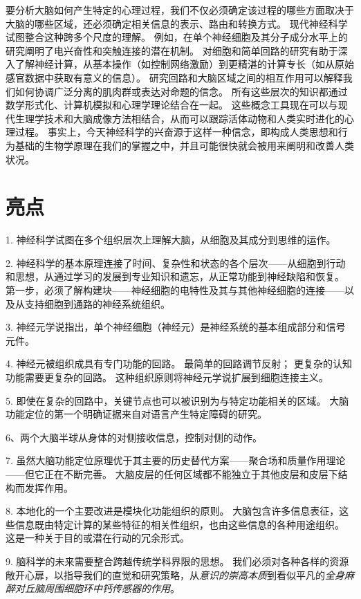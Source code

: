 要分析大脑如何产生特定的心理过程，我们不仅必须确定该过程的哪些方面取决于大脑的哪些区域，还必须确定相关信息的表示、路由和转换方式。
现代神经科学试图整合这种跨多个尺度的理解。
例如，在单个神经细胞及其分子成分水平上的研究阐明了电兴奋性和突触连接的潜在机制。
对细胞和简单回路的研究有助于深入了解神经计算，从基本操作（如控制网络激励）到更精湛的计算专长（如从原始感官数据中获取有意义的信息）。
研究回路和大脑区域之间的相互作用可以解释我们如何协调广泛分离的肌肉群或表达对命题的信念。
所有这些层次的知识都通过数学形式化、计算机模拟和心理学理论结合在一起。
这些概念工具现在可以与现代生理学技术和大脑成像方法相结合，从而可以跟踪活体动物和人类实时进化的心理过程。
事实上，今天神经科学的兴奋源于这样一种信念，即构成人类思想和行为基础的生物学原理在我们的掌握之中，并且可能很快就会被用来阐明和改善人类状况。




\section{亮点}

1. 神经科学试图在多个组织层次上理解大脑，从细胞及其成分到思维的运作。


2. 神经科学的基本原理连接了时间、复杂性和状态的各个层次——从细胞到行动和思想，从通过学习的发展到专业知识和遗忘，从正常功能到神经缺陷和恢复。
第一步，必须了解构建块——神经细胞的电特性及其与其他神经细胞的连接——以及从支持细胞到通路的神经系统组织。


3. 神经元学说指出，单个神经细胞（神经元）是神经系统的基本组成部分和信号元件。


4. 神经元被组织成具有专门功能的回路。
最简单的回路调节反射；
更复杂的认知功能需要更复杂的回路。
这种组织原则将神经元学说扩展到细胞连接主义。


5. 即使在复杂的回路中，关键节点也可以被识别为与特定功能相关的区域。
大脑功能定位的第一个明确证据来自对语言产生特定障碍的研究。


6、两个大脑半球从身体的对侧接收信息，控制对侧的动作。


7. 虽然大脑功能定位原理优于其主要的历史替代方案——聚合场和质量作用理论——但它正在不断完善。
大脑皮层的任何区域都不能独立于其他皮层和皮层下结构而发挥作用。


8. 本地化的一个主要改进是模块化功能组织的原则。
大脑包含许多信息表征，这些信息既由特定计算的某些特征的相关性组织，也由这些信息的各种用途组织。
这是一种关于目的或潜在行动的冗余形式。


9. 脑科学的未来需要整合跨越传统学科界限的思想。
我们必须对各种各样的资源敞开心扉，以指导我们的直觉和研究策略，从\textit{意识的崇高本质}到看似平凡的\textit{全身麻醉对丘脑周围细胞环中钙传感器的作用}。

